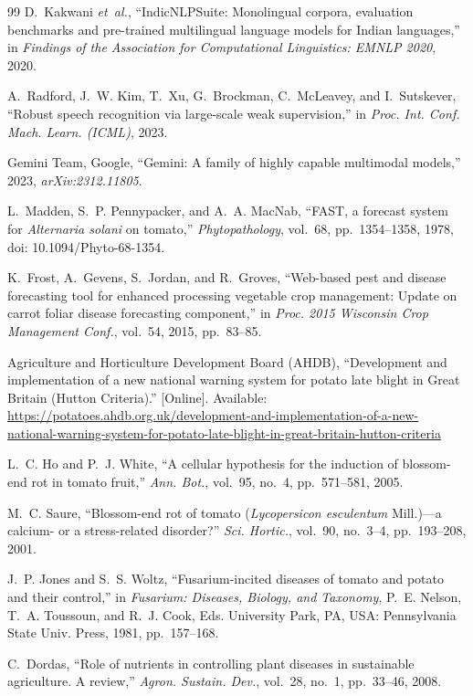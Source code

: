 \documentclass[conference]{IEEEtran}
\begin{document}
\begin{thebibliography}{99}
D.~Kakwani \emph{et~al.}, ``IndicNLPSuite: Monolingual corpora, evaluation benchmarks and pre-trained multilingual language models for Indian languages,'' in \emph{Findings of the Association for Computational Linguistics: EMNLP 2020}, 2020.

A.~Radford, J.~W. Kim, T.~Xu, G.~Brockman, C.~McLeavey, and I.~Sutskever, ``Robust speech recognition via large-scale weak supervision,'' in \emph{Proc. Int. Conf. Mach. Learn. (ICML)}, 2023.

Gemini Team, Google, ``Gemini: A family of highly capable multimodal models,'' 2023, \emph{arXiv:2312.11805}.

L.~Madden, S.~P. Pennypacker, and A.~A. MacNab, ``FAST, a forecast system for \emph{Alternaria solani} on tomato,'' \emph{Phytopathology}, vol.~68, pp.~1354--1358, 1978, doi: 10.1094/Phyto-68-1354.

K.~Frost, A.~Gevens, S.~Jordan, and R.~Groves, ``Web-based pest and disease forecasting tool for enhanced processing vegetable crop management: Update on carrot foliar disease forecasting component,'' in \emph{Proc. 2015 Wisconsin Crop Management Conf.}, vol.~54, 2015, pp.~83--85.

Agriculture and Horticulture Development Board (AHDB), ``Development and implementation of a new national warning system for potato late blight in Great Britain (Hutton Criteria).'' [Online]. Available: \url{https://potatoes.ahdb.org.uk/development-and-implementation-of-a-new-national-warning-system-for-potato-late-blight-in-great-britain-hutton-criteria}

L.~C. Ho and P.~J. White, ``A cellular hypothesis for the induction of blossom-end rot in tomato fruit,'' \emph{Ann. Bot.}, vol.~95, no.~4, pp.~571--581, 2005.

M.~C. Saure, ``Blossom-end rot of tomato (\emph{Lycopersicon esculentum} Mill.)---a calcium- or a stress-related disorder?'' \emph{Sci. Hortic.}, vol.~90, no.~3--4, pp.~193--208, 2001.

J.~P. Jones and S.~S. Woltz, ``Fusarium-incited diseases of tomato and potato and their control,'' in \emph{Fusarium: Diseases, Biology, and Taxonomy}, P.~E. Nelson, T.~A. Toussoun, and R.~J. Cook, Eds. University Park, PA, USA: Pennsylvania State Univ. Press, 1981, pp.~157--168.

C.~Dordas, ``Role of nutrients in controlling plant diseases in sustainable agriculture. A review,'' \emph{Agron. Sustain. Dev.}, vol.~28, no.~1, pp.~33--46, 2008.


\end{thebibliography}
\end{document}
